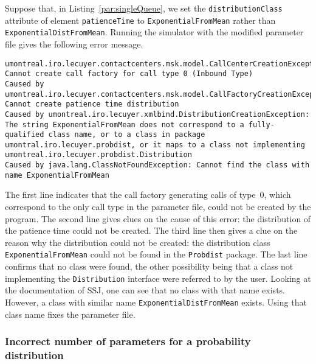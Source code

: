 Suppose that, in Listing~\ref{par:singleQueue}, we set the
\texttt{distribution\-Class} attribute of element
\texttt{patience\-Time} to \texttt{Exponential\-From\-Mean} rather
than \texttt{Exponential\-Dist\-From\-Mean}.
Running the simulator with the modified parameter file gives the
following error message.
%
\begin{lstlisting}[language={},breaklines,prebreak={\char92}]
umontreal.iro.lecuyer.contactcenters.msk.model.CallCenterCreationException: Cannot create call factory for call type 0 (Inbound Type)
Caused by umontreal.iro.lecuyer.contactcenters.msk.model.CallFactoryCreationException: Cannot create patience time distribution
Caused by umontreal.iro.lecuyer.xmlbind.DistributionCreationException: The string ExponentialFromMean does not correspond to a fully-qualified class name, or to a class in package umontral.iro.lecuyer.probdist, or it maps to a class not implementing umontreal.iro.lecuyer.probdist.Distribution
Caused by java.lang.ClassNotFoundException: Cannot find the class with name ExponentialFromMean
\end{lstlisting}
%
The first line indicates that the call factory generating calls of
type~0, which correspond to the only call type in the parameter file,
could not be created by the program.
The second line gives clues on the cause of this error:
the distribution of the patience time could not be created.
The third line then gives a clue on the reason why the distribution could
not be created: the distribution class
\texttt{Exponential\-From\-Mean} could not be found
in the \texttt{Probdist} package.
The last line confirms that no class were found, the other possibility
being that a class not implementing the \texttt{Distribution}
interface were referred to by the user.
Looking at the documentation of SSJ, one can see that no class with
that name exists. However, a class with similar name
\texttt{Exponential\-Dist\-From\-Mean} exists.  Using that class name
fixes the parameter file.

\subsubsection{Incorrect number of parameters for a probability distribution}


